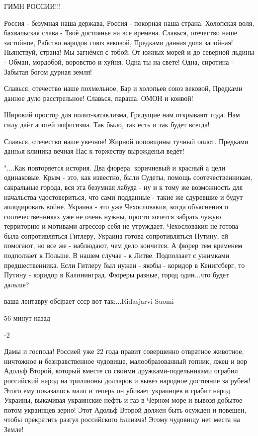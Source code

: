 ГИМН РОССИИ!!!

Россия - безумная наша держава,
Россия - покорная наша страна.
Холопская воля, бахвальская слава -
Твоё достоянье на все времена.
Славься, отечество наше застойное,
Рабство народов союз вековой,
Предками данная доля запойная!
Пьянствуй, страна! Мы загнёмся с тобой.
От южных морей и до северной льдины -
Обман, мордобой, воровство и хуйня.
Одна ты на свете! Одна, сиротина -
Забытая богом дурная земля!

Славься, отечество наше похмельное,
Бар и холопьев союз вековой,
Предками данное дуло расстрельное!
Славься, параша, ОМОН и конвой!


Широкий простор для полит-катаклизма,
Грядущие нам открывают года.
Нам силу даёт апогей пофигизма.
Так было, так есть и так будет всегда!


Славься, отечество наше увечное!
Жирной поповщины тучный оплот.
Предками даннaя клиника вечная
Нас к торжеству вырожденья ведёт!

"....Как повторяется история. Два фюрера: коричневый и красный а цели одинаковые.
Крым - это, как известно, были Судеты, помощь соотечественникам, сакральные города, вся эта безумная лабуда - ну и к тому же возможность для начальства удостовериться, что сами подданные - такие же сдуревшие и будут аплодировать войне. Украина - это уже Чехословакия, когда объяснения о соотечественниках уже не очень нужны, просто хочется забрать чужую территорию и мотивами агрессор себя не утруждает. Чехословакия не готова была сопротивляться Гитлеру, Украина готова сопротивляться Путину, ей помогают, но все же - наблюдают, чем дело кончится.
А фюрер тем временем подползает к Польше. В нашем случае - к Литве. Подползает с ужимками предшественника. Если Гитлеру был нужен - якобы - коридор в Кенигсберг, то Путину - коридор в Калининград. Фюреры разные, город один...что будет дальше?

ваша лентавру обсірает ссср вот так:...Ridasjarvi Suomi

56 минут назад

-2

Дамы и господа! Россией уже 22 года правит совершенно отвратное животное, ничтожное и безнравственное чудовище, малообразованный гопник, лжец и вор Адольф Второй, который вместе со своими дружками-подельниками ограбил российский народ на триллионы долларов и вывез народное достояние за рубеж! Этого ему показалось мало и теперь он убивает украинцев и грабит народ Украины, выкачивая украинские нефть и газ в Черном море и вывозя добытое потом украинцев зерно! Этот Адольф Второй должен быть осужден и повешен, чтобы прекратить разгул российского faшизма! Этому чудовищу нет места на Земле!

